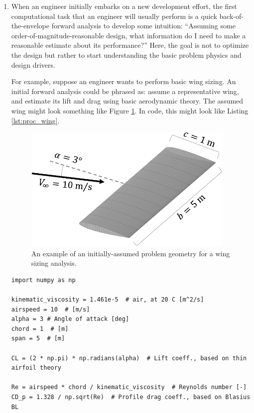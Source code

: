 \begin{enumerate}
    \item When an engineer initially embarks on a new development effort, the first computational task that an engineer will usually perform is a quick back-of-the-envelope forward analysis to develop some intuition: ``Assuming some order-of-magnitude-reasonable design, what information do I need to make a reasonable estimate about its performance?'' Here, the goal is not to optimize the design but rather to start understanding the basic problem physics and design drivers.

    For example, suppose an engineer wants to perform basic wing sizing. An initial forward analysis could be phrased as: assume a representative wing, and estimate its lift and drag using basic aerodynamic theory. The assumed wing might look something like Figure \ref{fig:proc_wing}. In code, this might look like Listing \ref{lst:proc_wing}.

    \begin{figure}[H]
        \centering
        \includegraphics[width=4in]{../figures/wing_proc-crop.pdf}
        \caption{An example of an initially-assumed problem geometry for a wing sizing analysis.}
        \label{fig:proc_wing}
    \end{figure}

    \begin{listing}[H]
        \begin{verbatim}
import numpy as np

kinematic_viscosity = 1.461e-5  # air, at 20 C [m^2/s]
airspeed = 10  # [m/s]
alpha = 3 # Angle of attack [deg]
chord = 1  # [m]
span = 5  # [m]

CL = (2 * np.pi) * np.radians(alpha)  # Lift coeff., based on thin airfoil theory

Re = airspeed * chord / kinematic_viscosity  # Reynolds number [-]
CD_p = 1.328 / np.sqrt(Re)  # Profile drag coeff., based on Blasius BL


\end{verbatim}
\end{listing}
\end{enumerate}
